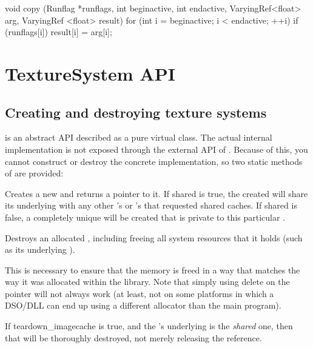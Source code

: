 \begin{code}
        void copy (Runflag *runflags, int beginactive, int endactive,
                   VaryingRef<float> arg, VaryingRef <float> result)
        {
            for (int i = beginactive; i < endactive;  ++i)
                if (runflags[i])
                    result[i] = arg[i];
        }
\end{code}


\newpage
\section{TextureSystem API}
\label{sec:texturesys:api}

\subsection{Creating and destroying texture systems}
\label{sec:texturesys:api:createdestroy}

\TextureSystem is an abstract API described as a pure
virtual class.  The actual internal implementation is not exposed
through the external API of \product.  Because of this, you cannot
construct or destroy the concrete implementation, so two static
methods of \TextureSystem are provided:

Creates a new \TextureSystem and returns a pointer to it.
If {\cf shared} is {\cf true}, the \TextureSystem created will share its
underlying \ImageCache with any other \TextureSystem's or \ImageCache's
that requested shared caches.  If {\cf shared} is {\cf false}, a
completely unique \ImageCache will be created that is private to this
particular \TextureSystem.
\apiend

Destroys an allocated \TextureSystem, including freeing all system
resources that it holds (such as its underlying \ImageCache).

This is necessary to ensure that the memory is freed in a way that
matches the way it was allocated within the library.  Note that simply
using {\cf delete} on the pointer will not always work (at least,
not on some platforms in which a DSO/DLL can end up using a different
allocator than the main program).

If {\cf teardown_imagecache} is {\cf true}, and the \TextureSystem's
underlying \ImageCache is the \emph{shared} one, then that \ImageCache will
be thoroughly destroyed, not merely releasing the reference. \apiend

